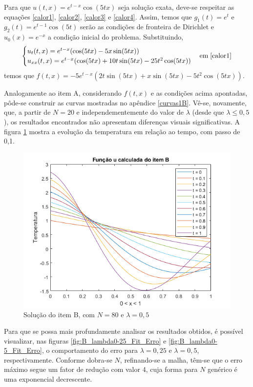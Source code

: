 \documentclass[12pt]{article}
\begin{document}
\begin{spacing}{1.5}
Para que $u(t,x)=e^{t-x}\cos(5tx)$ seja solução exata, deve-se respeitar as equações \eqref{calor1}, \eqref{calor2}, \eqref{calor3} e \eqref{calor4}. Assim, temos que $g_{1}(t) = e^{t}$ e $g_{2}(t) = e^{t-1}\cos(5t)$ serão as condições de fronteira de Dirichlet e $u_{0}(x) = e^{-x}$ a condição inicial do problema. Substituindo,
\begin{equation*}
\begin{cases}
    u_{t}(t,x)=e^{t-x}(\cos(5tx)-5x\sin(5tx)) \\
    u_{xx}(t,x)=e^{t-x}(\cos(5tx)+10t\sin(5tx)-25t^{2}\cos(5tx))
\end{cases} \text{em} \; \eqref{calor1}
\end{equation*}
temos que $ f(t,x)=-5e^{t-x}(2t\sin(5tx)+x\sin(5tx)-5t^{2}\cos(5tx))$.

Analogamente ao item A, considerando $f(t,x)$ e as condições acima apontadas, pôde-se construir as curvas mostradas no apêndice \ref{curvas1B}. Vê-se, novamente, que, a partir de $N=20$ e independementemente do valor de $\lambda$ (desde que $\lambda \leq 0,5$), os resultados encontrados não apresentam diferenças visuais significativas. A figura \ref{fig:itemB_2D} mostra a evolução da temperatura em relação ao tempo, com passo de 0,1.

\begin{figure}[ht!]
    \centering
    \includegraphics[width=0.8\linewidth]{Primeira_Tarefa/ItemB/itemB_2D.png}
    \caption{Solução do item B, com $N=80$ e $\lambda=0,5$}
    \label{fig:itemB_2D}
\end{figure}

Para que se possa mais profundamente analisar os resultados obtidos, é possível visualizar, nas figuras \ref{fig:B_lambda0-25_Fit_Erro} e \ref{fig:B_lambda0-5_Fit_Erro}, o comportamento do erro para $\lambda = 0,25$ e $\lambda = 0,5$, respectivamente. Conforme dobra-se $N$, refinando-se a malha, têm-se que o erro máximo segue um fator de redução com valor 4, cuja forma para $N$ genérico é uma exponencial decrescente.


\end{spacing}
\end{document}
